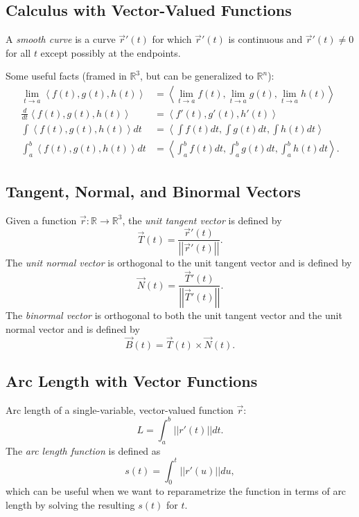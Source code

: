 \documentclass[12pt]{article}
\theoremstyle{definition}
\begin{document}
\subsection{Calculus with Vector-Valued Functions}
A \textit{smooth curve} is a curve $\vec{r}'(t)$ for which $\vec{r}'(t)$ is continuous and $\vec{r}'(t)\neq 0$ for all $t$ except possibly at the endpoints.

Some useful facts (framed in $\mathbb{R}^3$, but can be generalized to $\mathbb{R}^n$): \begin{align*}
	\lim_{t \to a} \left\langle f(t), g(t), h(t) \right\rangle & = \left\langle \lim_{t \to a} f(t), \lim_{t \to a} g(t), \lim_{t \to a} h(t) \right\rangle \\
	\frac{d}{dt}\left\langle f(t), g(t), h(t) \right\rangle    & = \left\langle f'(t), g'(t), h'(t) \right\rangle                                           \\
	\int \left\langle f(t), g(t), h(t) \right\rangle dt        & = \left\langle \int f(t) dt, \int g(t) dt, \int h(t) dt \right\rangle                      \\
	\int_a^b \left\langle f(t), g(t), h(t) \right\rangle dt    & = \left\langle \int_a^b f(t) dt, \int_a^b g(t) dt, \int_a^b h(t) dt \right\rangle.
\end{align*}

\subsection{Tangent, Normal, and Binormal Vectors}
Given a function $\vec{r} : \mathbb{R} \to \mathbb{R}^3$, the \textit{unit tangent vector} is defined by \begin{equation*}
	\vec{T}(t) = \frac{\vec{r}'(t)}{\left|\left|\vec{r}'(t)\right|\right|}.
\end{equation*}
The \textit{unit normal vector} is orthogonal to the unit tangent vector and is defined by \begin{equation*}
	\vec{N}(t) = \frac{\vec{T}'(t)}{\left|\left|\vec{T}'(t)\right|\right|}.
\end{equation*}
The \textit{binormal vector} is orthogonal to both the unit tangent vector and the unit normal vector and is defined by \begin{equation*}
	\vec{B}(t) = \vec{T}(t) \times \vec{N}(t).
\end{equation*}

\subsection{Arc Length with Vector Functions}
Arc length of a single-variable, vector-valued function $\vec{r}$: \begin{equation*}
	L = \int_a^b \left| \left| r'(t) \right| \right|dt.
\end{equation*}
The \textit{arc length function} is defined as \begin{equation*}
	s(t) = \int_0^t \left| \left| r'(u) \right| \right| du,
\end{equation*}
which can be useful when we want to reparametrize the function in terms of arc length by solving the resulting $s(t)$ for $t$.
\end{document}
